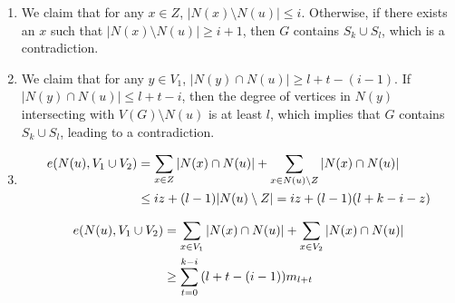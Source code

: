 \documentclass[12pt]{elsarticle}
\begin{document}
    
    


\begin{enumerate}[label=(\alph*)]
    \item We claim that for any $x \in Z$, $|N(x) \setminus N(u)| \le i$. Otherwise, if there exists an $x$ such that $|N(x) \setminus N(u)| \ge i + 1$, then $G$ contains $S_k \cup S_l$, which is a contradiction.
    
    \item We claim that for any $y \in V_1$, $|N(y) \cap N(u)| \ge l + t - (i - 1)$. If $|N(y) \cap N(u)| \le l + t - i$, then the degree of vertices in $N(y)$ intersecting with $V(G) \setminus N(u)$ is at least $l$, which implies that $G$ contains $S_k \cup S_l$, leading to a contradiction.
    
    \item 
    \begin{align}
        e(N(u), V_1 \cup V_2) &= \sum_{x\in Z} |N(x) \cap N(u)| + \sum_{x\in N(u)\setminus Z} |N(x) \cap N(u)| \notag \\ 
        &\le iz + (l - 1)|N(u) \setminus Z| = iz + (l - 1)(l + k - i - z) \notag
    \end{align}
    
    \begin{small}
    \begin{align}
    e(N(u), V_1 \cup V_2) &= \sum_{x\in V_1}{|N(x) \cap N(u)|} + \sum_{x\in V_2}{|N(x) \cap N(u)|} \notag \\
    &\ge \sum_{t=0}^{k-i}{(l + t - (i - 1)) m_{l + t}} \notag
    \end{align}
    \end{small}
\end{enumerate}
\end{document}
